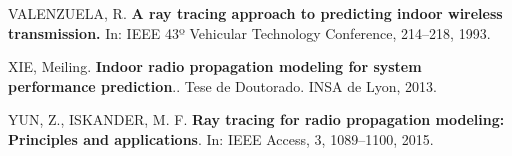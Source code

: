 \documentclass[
	12pt,				%
	openright,			%
	twoside,			%
	a4paper,			%
	english,			%
	french,				%
	spanish,			%
	brazil				%
	]{abntex2}
\begin{document}
\noindent
VALENZUELA, R. \textbf{A ray tracing approach to predicting indoor wireless transmission.} In: IEEE 43º Vehicular Technology Conference, 214–218, 1993.

\noindent
XIE, Meiling. \textbf{Indoor radio propagation modeling for system performance prediction}.. Tese de Doutorado. INSA de Lyon, 2013. 

\noindent
YUN, Z., ISKANDER, M. F. \textbf{Ray tracing for radio propagation modeling: Principles and applications}. In: IEEE Access, 3, 1089–1100, 2015.


%
%











\end{document}
